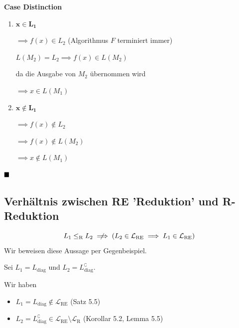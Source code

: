\documentclass[a4paper, 11pt]{article}
\def\Lre{\mathcal{L}_\text{RE}}
\def\Lr{\mathcal{L}_\text{R}}
\begin{document}
                            \textbf{Case Distinction}
                            \begin{enumerate}[label=\Roman*.]
                                \item $\mathbf{x \in L_1}$
                                
                                $\implies f(x) \in L_2$  (Algorithmus $F$ terminiert immer)
                        
                                $L(M_2) = L_2 \implies f(x) \in L(M_2)$ 
                                
                                da die Ausgabe von $M_2$ übernommen wird
                                
                                $\implies x \in L(M_1)$
                                \item $\mathbf{x \notin L_1}$
                                
                                $\implies f(x) \notin L_2$
                        
                                $\implies f(x) \notin L(M_2)$
                        
                                $\implies x \notin L(M_1)$
                            \end{enumerate}
                            $\hfill\blacksquare$
                        
                            \subsection{Verhältnis zwischen RE 'Reduktion' und R-Reduktion}
                            
                            $$L_1 \leq_{\text{R}} L_2 \centernot{\implies} (L_2 \in \Lre \implies L_1 \in \Lre)$$
                            Wir beweisen diese Aussage per Gegenbeispiel. 
                        
                            Sei $L_1 = L_{\text{diag}}$ und $L_2 = L_{\text{diag}}^\complement$.
                        
                            Wir haben 
                            \begin{itemize}[label=$\blacktriangleright$]
                                \item $L_1 = L_{\text{diag}} \notin \Lre$ \hfill (Satz 5.5)
                                \item $L_2 = L_{\text{diag}}^\complement \in \Lre\setminus\Lr$ \hfill(Korollar 5.2, Lemma 5.5)
                            \end{itemize}
                            
\end{document}
